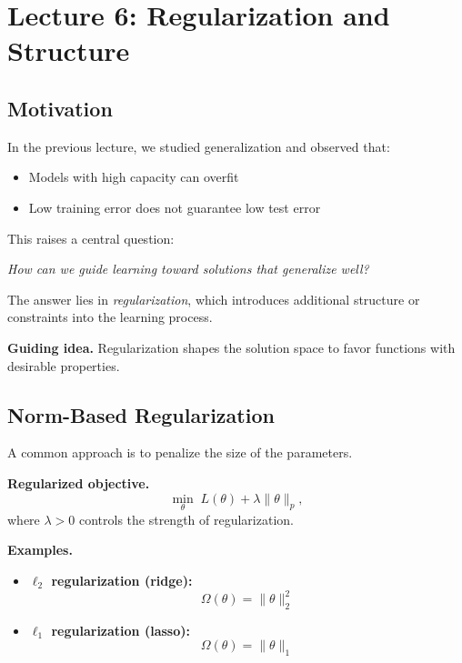 \section{Lecture 6: Regularization and Structure}

\subsection{Motivation}

In the previous lecture, we studied generalization and observed that:

\begin{itemize}
    \item Models with high capacity can overfit
    \item Low training error does not guarantee low test error
\end{itemize}

\medskip

\noindent
This raises a central question:

\medskip

\noindent
\textit{How can we guide learning toward solutions that generalize well?}

\medskip

\noindent
The answer lies in \emph{regularization}, which introduces additional structure or constraints into the learning process.

\medskip

\noindent
\textbf{Guiding idea.}  
Regularization shapes the solution space to favor functions with desirable properties.

\subsection{Norm-Based Regularization}

A common approach is to penalize the size of the parameters.

\medskip

\noindent
\textbf{Regularized objective.}
\[
\min_\theta \; L(\theta) + \lambda \|\theta\|_p,
\]
where $\lambda > 0$ controls the strength of regularization.

\medskip

\noindent
\textbf{Examples.}

\begin{itemize}
    \item \textbf{$\ell_2$ regularization (ridge):}
    \[
    \Omega(\theta) = \|\theta\|_2^2
    \]

    \item \textbf{$\ell_1$ regularization (lasso):}
    \[
    \Omega(\theta) = \|\theta\|_1
    \]
\end{itemize}

